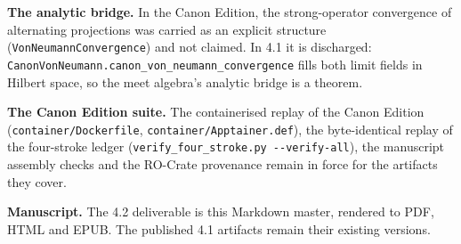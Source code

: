 \documentclass[
]{article}
\begin{document}
\textbf{The analytic bridge.} In the Canon Edition, the strong-operator
convergence of alternating projections was carried as an explicit
structure
(\texttt{V\allowbreak{}o\allowbreak{}n\allowbreak{}N\allowbreak{}e\allowbreak{}u\allowbreak{}m\allowbreak{}a\allowbreak{}n\allowbreak{}n\allowbreak{}C\allowbreak{}o\allowbreak{}n\allowbreak{}v\allowbreak{}e\allowbreak{}r\allowbreak{}g\allowbreak{}e\allowbreak{}n\allowbreak{}c\allowbreak{}e})
and not claimed. In 4.1 it is discharged:
\texttt{C\allowbreak{}a\allowbreak{}n\allowbreak{}o\allowbreak{}n\allowbreak{}V\allowbreak{}o\allowbreak{}n\allowbreak{}N\allowbreak{}e\allowbreak{}u\allowbreak{}m\allowbreak{}a\allowbreak{}n\allowbreak{}n\allowbreak{}.\allowbreak{}c\allowbreak{}a\allowbreak{}n\allowbreak{}o\allowbreak{}n\allowbreak{}\_\allowbreak{}v\allowbreak{}o\allowbreak{}n\allowbreak{}\_\allowbreak{}n\allowbreak{}e\allowbreak{}u\allowbreak{}m\allowbreak{}a\allowbreak{}n\allowbreak{}n\allowbreak{}\_\allowbreak{}c\allowbreak{}o\allowbreak{}n\allowbreak{}v\allowbreak{}e\allowbreak{}r\allowbreak{}g\allowbreak{}e\allowbreak{}n\allowbreak{}c\allowbreak{}e}
fills both limit fields in Hilbert space, so the meet algebra's analytic
bridge is a theorem.

\textbf{The Canon Edition suite.} The containerised replay of the Canon
Edition
(\texttt{c\allowbreak{}o\allowbreak{}n\allowbreak{}t\allowbreak{}a\allowbreak{}i\allowbreak{}n\allowbreak{}e\allowbreak{}r\allowbreak{}/\allowbreak{}D\allowbreak{}o\allowbreak{}c\allowbreak{}k\allowbreak{}e\allowbreak{}r\allowbreak{}f\allowbreak{}i\allowbreak{}l\allowbreak{}e},
\texttt{c\allowbreak{}o\allowbreak{}n\allowbreak{}t\allowbreak{}a\allowbreak{}i\allowbreak{}n\allowbreak{}e\allowbreak{}r\allowbreak{}/\allowbreak{}A\allowbreak{}p\allowbreak{}p\allowbreak{}t\allowbreak{}a\allowbreak{}i\allowbreak{}n\allowbreak{}e\allowbreak{}r\allowbreak{}.\allowbreak{}d\allowbreak{}e\allowbreak{}f}),
the byte-identical replay of the four-stroke ledger
(\texttt{v\allowbreak{}e\allowbreak{}r\allowbreak{}i\allowbreak{}f\allowbreak{}y\allowbreak{}\_\allowbreak{}f\allowbreak{}o\allowbreak{}u\allowbreak{}r\allowbreak{}\_\allowbreak{}s\allowbreak{}t\allowbreak{}r\allowbreak{}o\allowbreak{}k\allowbreak{}e\allowbreak{}.\allowbreak{}p\allowbreak{}y\allowbreak{} \allowbreak{}-\allowbreak{}-\allowbreak{}v\allowbreak{}e\allowbreak{}r\allowbreak{}i\allowbreak{}f\allowbreak{}y\allowbreak{}-\allowbreak{}a\allowbreak{}l\allowbreak{}l}),
the manuscript assembly checks and the RO-Crate provenance remain in
force for the artifacts they cover.

\textbf{Manuscript.} The 4.2 deliverable is this Markdown master,
rendered to PDF, HTML and EPUB. The published 4.1 artifacts remain their
existing versions.
\end{document}
